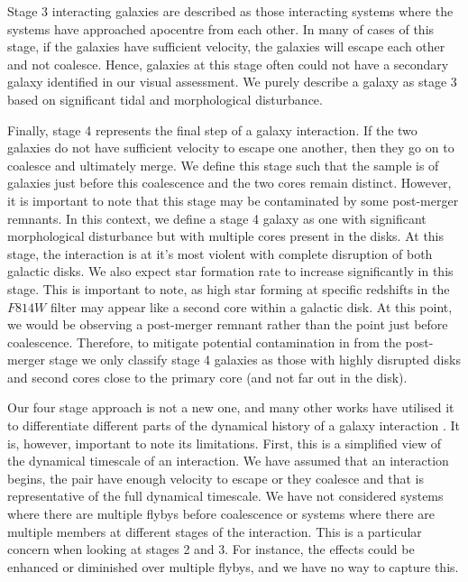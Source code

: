 \documentclass[fleqn,usenatbib]{mnras}
\begin{document}
Stage 3 interacting galaxies are described as those interacting systems where the systems have approached apocentre from each other. In many of cases of this stage, if the galaxies have sufficient velocity, the galaxies will escape each other and not coalesce. Hence, galaxies at this stage often could not have a secondary galaxy identified in our visual assessment. We purely describe a galaxy as stage 3 based on significant tidal and morphological disturbance. 

Finally, stage 4 represents the final step of a galaxy interaction. If the two galaxies do not have sufficient velocity to escape one another, then they go on to coalesce and ultimately merge. We define this stage such that the sample is of galaxies just before this coalescence and the two cores remain distinct. However, it is important to note that this stage may be contaminated by some post-merger remnants. In this context, we define a stage 4 galaxy as one with significant morphological disturbance but with multiple cores present in the disks. At this stage, the interaction is at it's most violent with complete disruption of both galactic disks. We also expect star formation rate to increase significantly in this stage. This is important to note, as high star forming at specific redshifts in the $F814W$ filter may appear like a second core within a galactic disk. At this point, we would be observing a post-merger remnant rather than the point just before coalescence. Therefore, to mitigate potential contamination in from the post-merger stage we only classify stage 4 galaxies as those with highly disrupted disks and second cores close to the primary core (and not far out in the disk). 

Our four stage approach is not a new one, and many other works have utilised it to differentiate different parts of the dynamical history of a galaxy interaction \citep{2022ApJ...937...97C, 2023ApJ...952..122G}. It is, however, important to note its limitations. First, this is a simplified view of the dynamical timescale of an interaction. We have assumed that an interaction begins, the pair have enough velocity to escape or they coalesce and that is representative of the full dynamical timescale. We have not considered systems where there are multiple flybys before coalescence or systems where there are multiple members at different stages of the interaction. This is a particular concern when looking at stages 2 and 3. For instance, the effects could be enhanced or diminished over multiple flybys, and we have no way to capture this.
\end{document}
